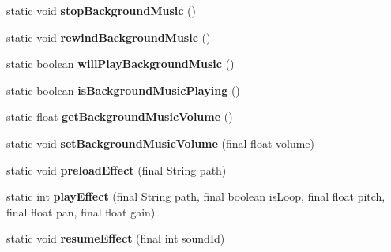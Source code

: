 \begin{DoxyCompactItemize}
static void {\bfseries stop\+Background\+Music} ()
\item 
\mbox{\label{classorg_1_1cocos2dx_1_1lib_1_1Cocos2dxHelper_aa29d148216e262a9633e9cf52dd2c673}} 
static void {\bfseries rewind\+Background\+Music} ()
\item 
\mbox{\label{classorg_1_1cocos2dx_1_1lib_1_1Cocos2dxHelper_a3bc31af9a7535436cb42ae162e68baf4}} 
static boolean {\bfseries will\+Play\+Background\+Music} ()
\item 
\mbox{\label{classorg_1_1cocos2dx_1_1lib_1_1Cocos2dxHelper_a16055077d456ccaccbf668f8ac16467c}} 
static boolean {\bfseries is\+Background\+Music\+Playing} ()
\item 
\mbox{\label{classorg_1_1cocos2dx_1_1lib_1_1Cocos2dxHelper_aef64e27ed9bef4b6660bb2ccf96f87c9}} 
static float {\bfseries get\+Background\+Music\+Volume} ()
\item 
\mbox{\label{classorg_1_1cocos2dx_1_1lib_1_1Cocos2dxHelper_a99ef8ee1522a618adfebb052efb83f44}} 
static void {\bfseries set\+Background\+Music\+Volume} (final float volume)
\item 
\mbox{\label{classorg_1_1cocos2dx_1_1lib_1_1Cocos2dxHelper_abc2afb6936f1a948f77645510d7e27e8}} 
static void {\bfseries preload\+Effect} (final String path)
\item 
\mbox{\label{classorg_1_1cocos2dx_1_1lib_1_1Cocos2dxHelper_a74b79a7275290250bba9d2bf5f7cd8fd}} 
static int {\bfseries play\+Effect} (final String path, final boolean is\+Loop, final float pitch, final float pan, final float gain)
\item 
\mbox{\label{classorg_1_1cocos2dx_1_1lib_1_1Cocos2dxHelper_aa5f4901db625d9ecf1b58248a4ef9c61}} 
static void {\bfseries resume\+Effect} (final int sound\+Id)
\item 
\mbox{\label{classorg_1_1cocos2dx_1_1lib_1_1Cocos2dxHelper_abadb775503f30260bcfa37688ac5ac62}} 

\end{DoxyCompactItemize}

